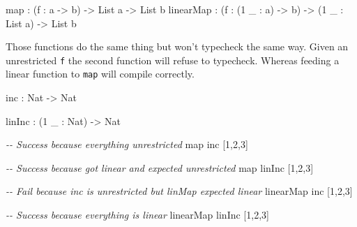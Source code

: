 \documentclass[
]{article}
\newenvironment{Shaded}{}{}
\newcommand{\CommentTok}[1]{\textcolor[rgb]{0.38,0.63,0.69}{\textit{#1}}}
\newcommand{\DataTypeTok}[1]{\textcolor[rgb]{0.56,0.13,0.00}{#1}}
\newcommand{\DecValTok}[1]{\textcolor[rgb]{0.25,0.63,0.44}{#1}}
\newcommand{\FunctionTok}[1]{\textcolor[rgb]{0.02,0.16,0.49}{#1}}
\newcommand{\NormalTok}[1]{#1}
\newcommand{\OperatorTok}[1]{\textcolor[rgb]{0.40,0.40,0.40}{#1}}
\newcommand{\OtherTok}[1]{\textcolor[rgb]{0.00,0.44,0.13}{#1}}
\begin{document}
\begin{Shaded}
\begin{Highlighting}[]
\FunctionTok{map} \OperatorTok{:}\NormalTok{ (f }\OperatorTok{:}\NormalTok{ a }\OtherTok{{-}\textgreater{}}\NormalTok{ b) }\OtherTok{{-}\textgreater{}} \DataTypeTok{List}\NormalTok{ a }\OtherTok{{-}\textgreater{}} \DataTypeTok{List}\NormalTok{ b}
\NormalTok{linearMap }\OperatorTok{:}\NormalTok{ (f }\OperatorTok{:}\NormalTok{ (}\DecValTok{1}\NormalTok{ \_ }\OperatorTok{:}\NormalTok{ a) }\OtherTok{{-}\textgreater{}}\NormalTok{ b) }\OtherTok{{-}\textgreater{}}\NormalTok{ (}\DecValTok{1}\NormalTok{ \_ }\OperatorTok{:} \DataTypeTok{List}\NormalTok{ a) }\OtherTok{{-}\textgreater{}} \DataTypeTok{List}\NormalTok{ b}
\end{Highlighting}
\end{Shaded}

Those functions do the same thing but won't typecheck the same way.
Given an unrestricted \texttt{f} the second function will refuse to
typecheck. Whereas feeding a linear function to \texttt{map} will
compile correctly.

\begin{Shaded}
\begin{Highlighting}[]
\NormalTok{inc }\OperatorTok{:} \DataTypeTok{Nat} \OtherTok{{-}\textgreater{}} \DataTypeTok{Nat}

\NormalTok{linInc }\OperatorTok{:}\NormalTok{ (}\DecValTok{1}\NormalTok{ \_ }\OperatorTok{:} \DataTypeTok{Nat}\NormalTok{) }\OtherTok{{-}\textgreater{}} \DataTypeTok{Nat}

\CommentTok{{-}{-} Success because everything unrestricted}
\FunctionTok{map}\NormalTok{ inc [}\DecValTok{1}\NormalTok{,}\DecValTok{2}\NormalTok{,}\DecValTok{3}\NormalTok{] }

\CommentTok{{-}{-} Success because got linear and expected unrestricted}
\FunctionTok{map}\NormalTok{ linInc [}\DecValTok{1}\NormalTok{,}\DecValTok{2}\NormalTok{,}\DecValTok{3}\NormalTok{]}

\CommentTok{{-}{-} Fail because inc is unrestricted but linMap expected linear}
\NormalTok{linearMap inc [}\DecValTok{1}\NormalTok{,}\DecValTok{2}\NormalTok{,}\DecValTok{3}\NormalTok{]}

\CommentTok{{-}{-} Success because everything is linear}
\NormalTok{linearMap linInc [}\DecValTok{1}\NormalTok{,}\DecValTok{2}\NormalTok{,}\DecValTok{3}\NormalTok{]}
\end{Highlighting}
\end{Shaded}
\end{document}
